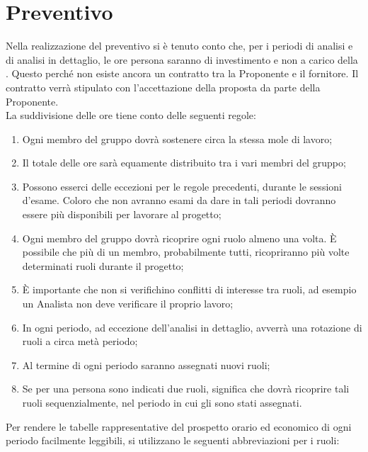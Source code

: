 \section{Preventivo} \label{preventivo}

    Nella realizzazione del preventivo si è tenuto conto che, per i periodi di analisi e di analisi in dettaglio,
    le ore persona saranno di investimento e non a carico della . Questo perché non esiste ancora un contratto
    tra la Proponente e il fornitore. Il contratto verrà stipulato con l'accettazione della proposta da parte della
    Proponente. \\
    La suddivisione delle ore tiene conto delle seguenti regole:

        \begin{enumerate}
            \item Ogni membro del gruppo dovrà sostenere circa la stessa mole di lavoro;
            \item Il totale delle ore sarà equamente distribuito tra i vari membri del gruppo;
            \item Possono esserci delle eccezioni per le regole precedenti, durante le sessioni d'esame.
            Coloro che non avranno esami da dare in tali periodi dovranno essere più disponibili per lavorare al progetto;
            \item Ogni membro del gruppo dovrà ricoprire ogni ruolo almeno una volta. È possibile che più di
            un membro, probabilmente tutti, ricopriranno più volte determinati ruoli durante il progetto;
            \item È importante che non si verifichino conflitti di interesse tra ruoli, ad esempio un Analista
            non deve verificare il proprio lavoro;
            \item In ogni periodo, ad eccezione dell'analisi in dettaglio, avverrà una rotazione di ruoli a
            circa metà periodo;
            \item Al termine di ogni periodo saranno assegnati nuovi ruoli;
            \item Se per una persona sono indicati due ruoli, significa che dovrà ricoprire tali ruoli sequenzialmente,
            nel periodo in cui gli sono stati assegnati.
        \end{enumerate}

    Per rendere le tabelle rappresentative del prospetto orario ed economico di ogni periodo facilmente leggibili,
    si utilizzano le seguenti abbreviazioni per i ruoli:

